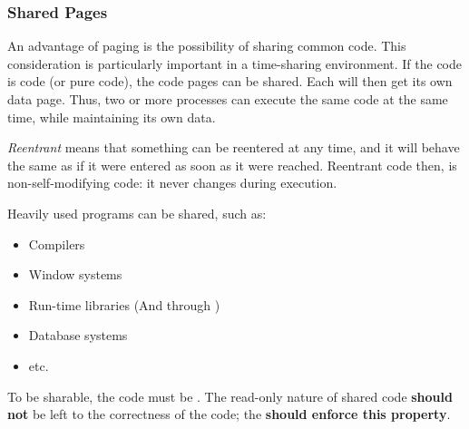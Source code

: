 \subsubsection{Shared Pages}\label{subsubsec:Shared_Pages}
An advantage of paging is the possibility of sharing common code.
This consideration is particularly important in a time-sharing environment.
If the code is  code (or pure code), the code pages can be shared.
Each  will then get its own data page.
Thus, two or more processes can execute the same code at the same time, while maintaining its own data.

\begin{definition}[Reentrant]\label{def:Reentrant}
  \emph{Reentrant} means that something can be reentered at any time, and it will behave the same as if it were entered as soon as it were reached.
  Reentrant code then, is non-self-modifying code: it never changes during execution.
\end{definition}

Heavily used programs can be shared, such as:
\begin{itemize}[noitemsep]
\item Compilers
\item Window systems
\item Run-time libraries (And through )
\item Database systems
\item etc.
\end{itemize}

To be sharable, the code must be .
The read-only nature of shared code \textbf{should not} be left to the correctness of the code; the \textbf{ should enforce this property}.

